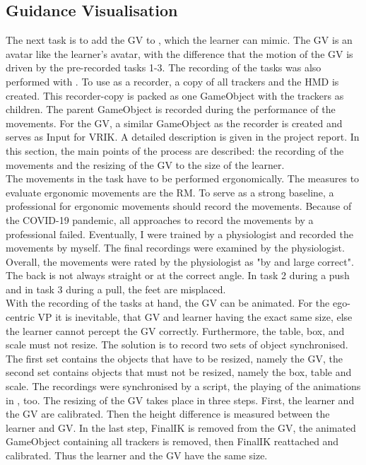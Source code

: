\subsection{Guidance Visualisation}
\label{sec:gv}
The next task is to add the GV to \exgo, which the learner can mimic. The GV is an avatar like the learner's avatar, with the difference that the motion of the GV is driven by the pre-recorded tasks 1-3. The recording of the tasks was also performed with \exgo. To use \exgo as a recorder, a copy of all trackers and the HMD is created. This recorder-copy is packed as one GameObject with the trackers as children. The parent GameObject is recorded during the performance of the movements. For the GV, a similar GameObject as the recorder is created and serves as Input for VRIK. A detailed description is given in the project report. In this section, the main points of the process are described: the recording of the movements and the resizing of the GV to the size of the learner.\\
The movements in the task have to be performed ergonomically. The measures to evaluate ergonomic movements are the RM. To serve as a strong baseline, a professional for ergonomic movements should record the movements. Because of the COVID-19 pandemic, all approaches to record the movements by a professional failed. Eventually, I were trained by a physiologist and recorded the movements by myself. The final recordings were examined by the physiologist. Overall, the movements were rated by the physiologist as "by and large correct". The back is not always straight or at the correct angle. In task 2 during a push and in task 3 during a pull, the feet are misplaced.\\
With the recording of the tasks at hand, the GV can be animated. For the ego-centric VP it is inevitable, that GV and learner having the exact same size, else the learner cannot percept the GV correctly. Furthermore, the table, box, and scale must not resize. The solution is to record two sets of object synchronised. The first set contains the objects that have to be resized, namely the GV, the second set contains objects that must not be resized, namely the box, table and scale. The recordings were synchronised by a script, the playing of the animations in \exgo, too. The resizing of the GV takes place in three steps. First, the learner and the GV are calibrated. Then the height difference is measured between the learner and GV. In the last step, FinalIK is removed from the GV, the animated GameObject containing all trackers is removed, then FinalIK reattached and calibrated. Thus the learner and the GV have the same size.


